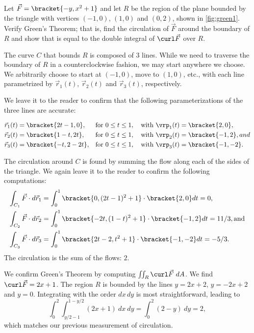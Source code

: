 {Let $\vec F =\bracket{-y,x^2+1}$ and let $R$ be the region of the plane bounded by the triangle with vertices $(-1,0)$, $(1,0)$ and $(0,2)$, shown in \autoref{fig:green1}. Verify Green's Theorem; that is, find the circulation of $\vec F$ around the boundary of $R$ and show that is equal to the double integral of $\curl \vec F$ over $R$.}
{The curve $C$ that bounds $R$ is composed of 3 lines. While we need to traverse the boundary of $R$ in a counterclockwise fashion, we may start anywhere we choose. We arbitrarily choose to start at $(-1,0)$, move to $(1,0)$, etc., with each line parametrized by $\vec r_1(t)$, $\vec r_2(t)$ and $\vec r_3(t)$, respectively.

We leave it to the reader to confirm that the following parameterizations of the three lines are accurate:

\begin{align*}
\vec r_1(t) &=\bracket{2t-1,0}, && \text{for }0\leq t\leq 1,\quad\text{with }\vrp_1(t) =\bracket{ 2,0},\\
\vec r_2(t) &=\bracket{1-t,2t}, && \text{for }0\leq t\leq 1,\quad\text{with }\vrp_2(t) =\bracket{ -1,2}, and\\
\vec r_3(t) &=\bracket{-t,2-2t}, && \text{for }0\leq t\leq 1,\quad\text{with } \vrp_3(t) =\bracket{ -1,-2}.
\end{align*}

The circulation around $C$ is found by summing the flow along each of the sides of the triangle. We again leave it to the reader to confirm the following computations:
\begin{align*}
\int_{C_1}\vec F\cdot d\vec r_1 &= \int_0^1\bracket{0,(2t-1)^2+1}\cdot\bracket{2,0}dt = 0,\\
\int_{C_2}\vec F\cdot d\vec r_2 &= \int_0^1\bracket{-2t,(1-t)^2+1}\cdot\bracket{-1,2}dt = 11/3, \text{and}\\
\int_{C_3}\vec F\cdot d\vec r_3 &= \int_0^1\bracket{2t-2,t^2+1}\cdot\bracket{-1,-2}dt = -5/3.
\end{align*}
The circulation is the sum of the flows: $2$.

We confirm Green's Theorem by computing $\iint_R \curl \vec F\ dA$. We find $\curl \vec F = 2x+1$. The region $R$ is bounded by the lines $y = 2x+2$, $y=-2x+2$ and $y=0$. Integrating with the order $dx\, dy$ is most straightforward, leading to
\[\int_0^2\int_{y/2-1}^{1-y/2} (2x+1)\ dx\ dy = \int_0^2 (2-y)\ dy = 2,\]
which matches our previous measurement of circulation.}

